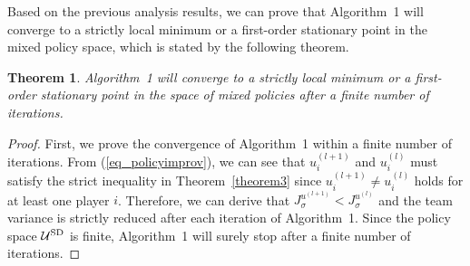\documentclass[12pt]{article}
\newtheorem{theorem}{Theorem}
\begin{document}
Based on the previous analysis results, we can prove that
Algorithm~1 will converge to a strictly local minimum or a
first-order stationary point in the mixed policy space, which is
stated by the following theorem.

\begin{theorem}
Algorithm~1 will converge to a strictly local minimum or a
first-order stationary point in the space of mixed policies after a
finite number of iterations.
\end{theorem}
\begin{proof}
First, we prove the convergence of Algorithm~1 within a finite
number of iterations. From (\ref{eq_policyimprov}), we can see that
$u_i^{(l+1)}$ and $u_i^{(l)}$ must satisfy the strict inequality in
Theorem~\ref{theorem3} since $u_i^{(l+1)} \neq u_i^{(l)}$ holds for
at least one player $i$. Therefore, we can derive that
$J^{u^{(l+1)}}_{\sigma} < J^{u^{(l)}}_{\sigma}$ and the team
variance is strictly reduced after each iteration of Algorithm~1.
Since the policy space $\mathcal U^{\rm SD}$ is finite, Algorithm~1
will surely stop after a finite number of iterations.


\end{proof}
\end{document}
